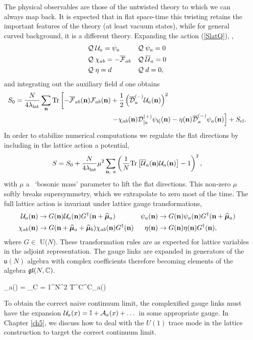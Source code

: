 The physical observables are those of the untwisted theory to which we can always map back.
It is expected that in flat space-time this twisting retains the important features 
of the theory (at least vacuum states), 
while for general curved background, it is a different theory. 
Expanding the action (\ref{SlatQ}), ,
\begin{align}
  & \mathcal Q\; \mathcal U_a = \psi_a          & & \mathcal Q\; \psi_a = 0 \nonumber \\
  & \mathcal Q\; \chi_{ab} = -{\overline{\cal F}}_{ab}  & & \mathcal Q\; {\overline{\cal U}}_a = 0 \label{BRSTlatticesymmetry} \\
  & \mathcal Q\; \eta = d                & & \mathcal Q\; d = 0, \nonumber
\end{align}
and integrating out the auxiliary field $d$ one obtains
\begin{equation}
  \label{eq:lat_act}
  \begin{split}
    S_0 & = \frac{N}{4\lambda_{\rm lat}} \sum_{\mathbf{n}} \mbox{Tr}\left[-{\overline{\cal F}}_{ab}(\mathbf{n}) {\cal F}_{ab}(\mathbf{n}) + \frac{1}{2}\left({\overline{\cal D}}_a^{(-)}\mathcal U_a(\mathbf{n})\right)^2 \right. \\
        & \qquad\qquad\qquad\qquad\qquad\qquad\qquad \left. - \chi_{ab}(\mathbf{n}) \mathcal D^{(+)}_{[a}\psi_{b]}(\mathbf{n}) - \eta(\mathbf{n}) {\overline{\cal D}}^{(-)}_a\psi_a(\mathbf{n})\right] + S_{\rm cl}.
  \end{split}
\end{equation}
In order to stabilize numerical computations we regulate the flat directions by
 including in the lattice action a potential, 
\begin{equation}
  \label{eq:mass}
  S = S_0 + \frac{N}{4\lambda_{\rm lat}} \mu^2 \sum_{\mathbf{n},\ a} \left(\frac{1}{N}\mbox{Tr}\left[{\overline{\cal U}}_a(\mathbf{n}) \mathcal U_a(\mathbf{n})\right] - 1\right)^2,
\end{equation}
with $\mu$ a ~`bosonic mass' parameter to lift the flat directions. 
This non-zero $\mu$ softly breaks supersymmetry, which we 
extrapolate to zero most of the time. 
The full lattice action is invariant under lattice gauge transformations,
\begin{align}
  \mathcal U_a(\mathbf{n}) & \to G(\mathbf{n})\mathcal U_a(\mathbf{n})G^{\dag}(\mathbf{n}+\widehat{\boldsymbol{\mu}}_a)                   &
  \psi_a(\mathbf{n}) & \to G(\mathbf{n})\psi_a(\mathbf{n})G^{\dag}(\mathbf{n}+\widehat{\boldsymbol{\mu}}_a)                 \\
  \chi_{ab}(\mathbf{n}) & \to G(\mathbf{n}+\widehat{\boldsymbol{\mu}}_a+\widehat{\boldsymbol{\mu}}_b)\chi_{ab}(\mathbf{n})G^{\dag}(\mathbf{n}) &
  \eta(\mathbf{n}) & \to G(\mathbf{n})\eta(\mathbf{n})G^{\dag}(\mathbf{n}),                              \nonumber
\end{align}
where $G \in$ U($N$).
These transformation rules are as expected for lattice variables in the adjoint representation.
The gauge links are expanded in generators of the $\mathfrak u(N)$ algebra with complex coefficients
therefore becoming elements of the algebra $\mathfrak{gl}(N, \mathbb C)$.

\beq
  \cU_a(\vn) = \sum_{C = 1}^{N^2} T^C\cU^C_a(\vn)
\eeq

To obtain the correct naive continuum limit, the complexified gauge links must have the 
expansion $\mathcal U_a(x) = \mathbb I + \mathcal A_a(x) + \dots$ in some appropriate gauge. 
In Chapter \ref{ch5}, we discuss how to deal with the $U(1)$ trace mode in the 
lattice construction to target the correct continuum limit. 